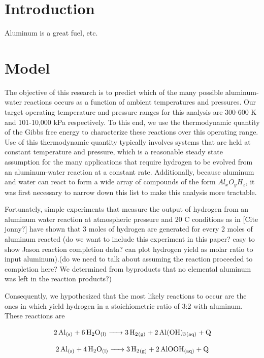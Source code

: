 \documentclass[preprint,12pt,3p]{elsarticle}
\begin{document}
\section{Introduction}
\label{introduction}

Aluminum is a great fuel, etc.

\section{Model}
\label{model}

The objective of this research is to predict which of the many possible
aluminum-water reactions occurs as a function of ambient temperatures and
pressures. Our target operating temperature and pressure ranges for this
analysis are 300-600 K and 101-10,000 kPa respectively. To this end, we use the
thermodynamic quantity of the Gibbs free energy to characterize these reactions
over this operating range. Use of this thermodynamic quantity typically involves
systems that are held at constant temperature and pressure, which is a
reasonable steady state assumption for the many applications that require
hydrogen to be evolved from an aluminum-water reaction at a constant rate.
Additionally, because aluminum and water can react to form a wide array of
compounds of the form $Al_xO_yH_z$, it was first necessary to narrow down this
list to make this analysis more tractable. 

Fortunately, simple experiments that measure the output of hydrogen from an
aluminum water reaction at atmospheric pressure and 20 \textdegree C conditions
as in [Cite jonny?] have shown that 3 moles of hydrogen are generated for every
2 moles of aluminum reacted (do we want to include this experiment in this
paper? easy to show Jason reaction completion data? can plot hydrogen yield as
molar ratio to input aluminum).(do we need to talk about assuming the reaction
proceeded to completion here? We determined from byproducts that no elemental
aluminum was left in the reaction products?)

Consequently, we hypothesized that the most likely reactions to occur are the
ones in which yield hydrogen in a stoichiometric ratio of 3:2 with aluminum.
These reactions are

\begin{equation}
  \ce{2Al_{(s)} + 6H2O_{(l)} -> 3H2_{(g)} + 2Al(OH)3_{(aq)} + Q}
  \label{eq:hydroxide}
\end{equation}

\begin{equation}
  \ce{2Al_{(s)} + 4H2O_{(l)} -> 3H2_{(g)} + 2AlOOH_{(aq)} + Q}
  \label{eq:oxyhydroxide}
\end{equation}
\end{document}
